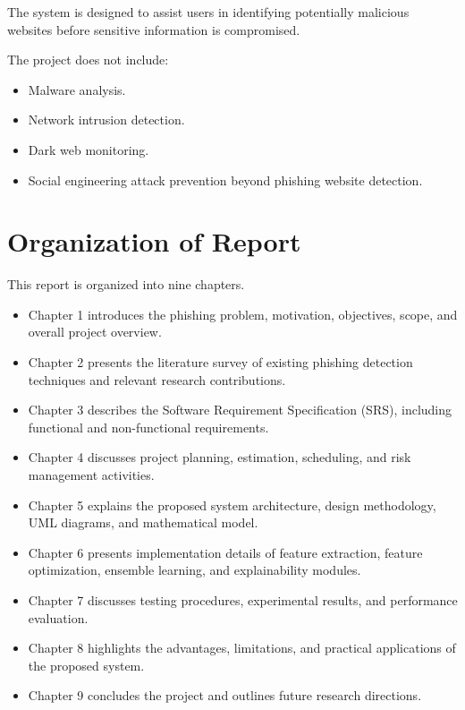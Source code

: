 \documentclass[12pt]{report}
\begin{document}
The system is designed to assist users in identifying potentially malicious websites before sensitive information is compromised.

The project does not include:

\begin{itemize}
    \item Malware analysis.
    \item Network intrusion detection.
    \item Dark web monitoring.
    \item Social engineering attack prevention beyond phishing website detection.
\end{itemize}

\section{Organization of Report}

This report is organized into nine chapters.

\begin{itemize}
    \item Chapter 1 introduces the phishing problem, motivation, objectives, scope, and overall project overview.

    \item Chapter 2 presents the literature survey of existing phishing detection techniques and relevant research contributions.

    \item Chapter 3 describes the Software Requirement Specification (SRS), including functional and non-functional requirements.

    \item Chapter 4 discusses project planning, estimation, scheduling, and risk management activities.

    \item Chapter 5 explains the proposed system architecture, design methodology, UML diagrams, and mathematical model.

    \item Chapter 6 presents implementation details of feature extraction, feature optimization, ensemble learning, and explainability modules.

    \item Chapter 7 discusses testing procedures, experimental results, and performance evaluation.

    \item Chapter 8 highlights the advantages, limitations, and practical applications of the proposed system.

    \item Chapter 9 concludes the project and outlines future research directions.
\end{itemize}
\end{document}
